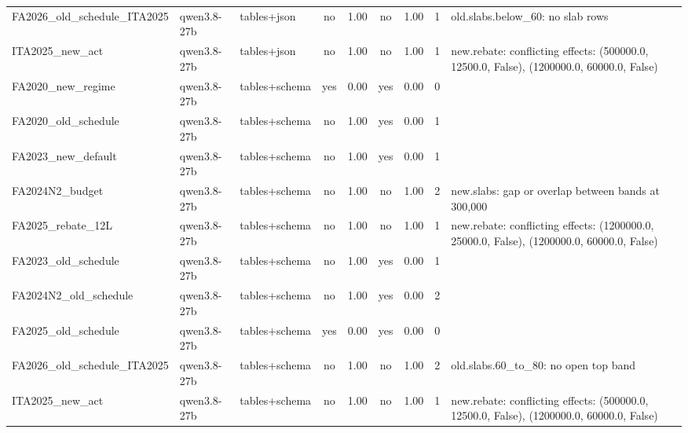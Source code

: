 \begin{table}[t]
\begin{tabular}{lllcrcrrl}
FA2026\_old\_schedule\_ITA2025 & qwen3.8-27b & tables+json & no & 1.00 & no & 1.00 & 1 & old.slabs.below\_60: no slab rows \\
ITA2025\_new\_act & qwen3.8-27b & tables+json & no & 1.00 & no & 1.00 & 1 & new.rebate: conflicting effects: (500000.0, 12500.0, False), (1200000.0, 60000.0, False) \\
FA2020\_new\_regime & qwen3.8-27b & tables+schema & yes & 0.00 & yes & 0.00 & 0 &  \\
FA2020\_old\_schedule & qwen3.8-27b & tables+schema & no & 1.00 & yes & 0.00 & 1 &  \\
FA2023\_new\_default & qwen3.8-27b & tables+schema & no & 1.00 & yes & 0.00 & 1 &  \\
FA2024N2\_budget & qwen3.8-27b & tables+schema & no & 1.00 & no & 1.00 & 2 & new.slabs: gap or overlap between bands at 300,000 \\
FA2025\_rebate\_12L & qwen3.8-27b & tables+schema & no & 1.00 & no & 1.00 & 1 & new.rebate: conflicting effects: (1200000.0, 25000.0, False), (1200000.0, 60000.0, False) \\
FA2023\_old\_schedule & qwen3.8-27b & tables+schema & no & 1.00 & yes & 0.00 & 1 &  \\
FA2024N2\_old\_schedule & qwen3.8-27b & tables+schema & no & 1.00 & yes & 0.00 & 2 &  \\
FA2025\_old\_schedule & qwen3.8-27b & tables+schema & yes & 0.00 & yes & 0.00 & 0 &  \\
FA2026\_old\_schedule\_ITA2025 & qwen3.8-27b & tables+schema & no & 1.00 & no & 1.00 & 2 & old.slabs.60\_to\_80: no open top band \\
ITA2025\_new\_act & qwen3.8-27b & tables+schema & no & 1.00 & no & 1.00 & 1 & new.rebate: conflicting effects: (500000.0, 12500.0, False), (1200000.0, 60000.0, False) \\
\bottomrule
\end{tabular}
\end{table}
